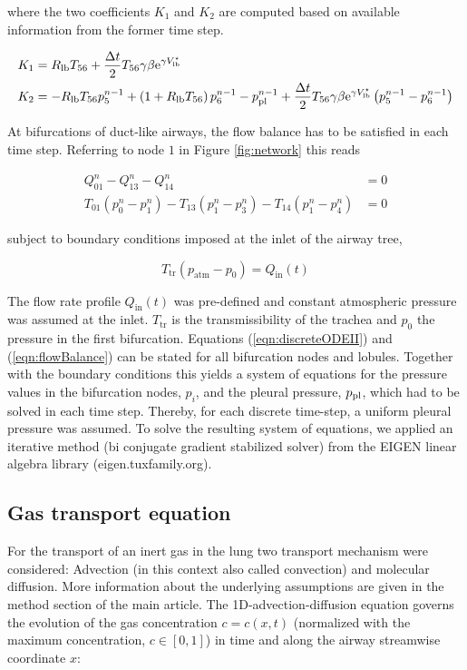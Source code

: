 where the two coefficients $K_1$ and $K_2$ are computed based on available information from the former time step.

\begin{align}
  K_1 &= R_{\mathrm{lb}} T_{56} + \frac{\Delta t}{2}T_{56}\gamma\beta\mathrm{e}^{\gamma V_{\mathrm{lb}}^\star} \\
  K_2 &= -R_{\mathrm{lb}} T_{56} p_5^{n-1} + \left( 1 + R_{\mathrm{lb}} T_{56}\right) p_6^{n-1} - p_{\mathrm{pl}}^{n-1} + \frac{\Delta t}{2}T_{56}\gamma\beta\mathrm{e}^{\gamma V_{\mathrm{lb}}^\star}\left( p_5^{n-1} - p_6^{n-1}\right)
\end{align}

At bifurcations of duct-like airways, the flow balance has to be satisfied in each time step.
Referring to node $1$ in Figure \ref{fig:network} this reads

\begin{equation} \label{eqn:flowBalance}
\begin{split}
Q_{01}^n - Q_{13}^n - Q_{14}^n &= 0 \\
T_{01}(p_0^n - p_1^n) - T_{13}(p_1^n - p_3^n) - T_{14}(p_1^n - p_4^n) &= 0
\end{split}
\end{equation}

subject to boundary conditions imposed at the inlet of the airway tree,

\begin{equation}
T_\mathrm{tr}(p_\mathrm{atm} - p_0) = Q_\mathrm{in}(t)
\end{equation}

The flow rate profile $Q_\mathrm{in}(t)$ was pre-defined and constant atmospheric pressure was assumed at the inlet.
$T_\mathrm{tr}$ is the transmissibility of the trachea and $p_0$ the pressure in the first bifurcation.
Equations (\ref{eqn:discreteODEII}) and (\ref{eqn:flowBalance}) can be stated for all bifurcation nodes and lobules.
Together with the boundary conditions this yields a system of equations for the pressure values in the bifurcation nodes, $p_i$, and the pleural pressure, $p_{\mathrm{pl}}$, which had to be solved in each time step.
Thereby, for each discrete time-step, a uniform pleural pressure was assumed.
To solve the resulting system of equations, we applied an iterative method (bi conjugate gradient stabilized solver) from the EIGEN linear algebra library (eigen.tuxfamily.org).


\subsection{Gas transport equation} \label{ssec:gas}
For the transport of an inert gas in the lung two transport mechanism were considered: Advection (in this context also called convection) and molecular diffusion.
More information about the underlying assumptions are given in the method section of the main article.
The 1D-advection-diffusion equation governs the evolution of the gas concentration $c = c(x,t)$ (normalized with the maximum concentration, $c\in[0,1]$) in time and along the airway streamwise coordinate $x$:

